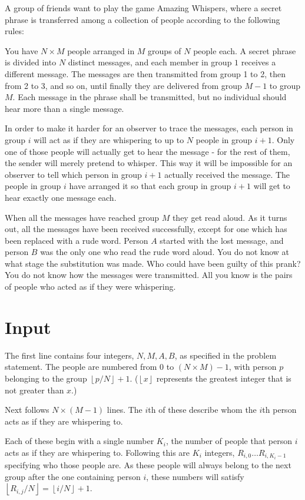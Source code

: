 \noindent
A group of friends want to play the game Amazing Whispers, where a secret phrase is transferred among a collection of people according to the following rules:

You have $N \times M$ people arranged in $M$ groups of $N$ people each.
A secret phrase is divided into $N$ distinct messages, and each member in group $1$ receives a different message. 
The messages are then transmitted from group 1 to 2, then from 2 to 3, and so on,
until finally they are delivered from group $M-1$ to group $M$. Each message in the phrase shall be transmitted, but no individual should hear more than a single message.

In order to make it harder for an observer to trace the messages, each person in group $i$ will 
act as if they are whispering to up to $N$ people in group $i+1$. Only one of those people will 
actually get to hear the message - for the rest of them, the sender will merely pretend to whisper. 
This way it will be impossible for an observer to tell which person in group $i+1$ actually received the message. The people in group $i$ have arranged it so that each group in group $i+1$ will get to hear exactly one message each.

When all the messages have reached group $M$ they get read aloud. As it turns out, all the messages have been received successfully, except for one which has been replaced with a rude word. 
Person $A$ started with the lost message, and person $B$ was the only one who read the rude word aloud. You do not know at what stage the substitution was made. Who could have been guilty of this prank? 
You do not know how the messages were transmitted. All you know is the pairs of people who acted as if they were whispering.

\section*{Input}
The first line contains four integers, $N, M, A, B$, as specified in the problem statement. 
The people are numbered from $0$ to $(N \times M) - 1$, 
with person $p$ belonging to the group $\left \lfloor{p/N}\right \rfloor + 1 $. ($\left \lfloor{x}\right \rfloor$ represents the greatest integer that is not greater than $x$.)

Next follows $N \times (M - 1)$ lines. The $i$th of these describe whom the $i$th person acts as if they are whispering to.

Each of these begin with a single number $K_i$, the number of people that person $i$ acts as if they are whispering to. Following this are $K_i$ integers, $R_{i,0} \ldots R_{i,K_i-1}$ specifying who those people are.
As these people will always belong to the next group after the one containing person $i$, these numbers will satisfy $\left \lfloor{R_{i,j}/N}\right \rfloor = \left \lfloor{i/N}\right \rfloor + 1$.

